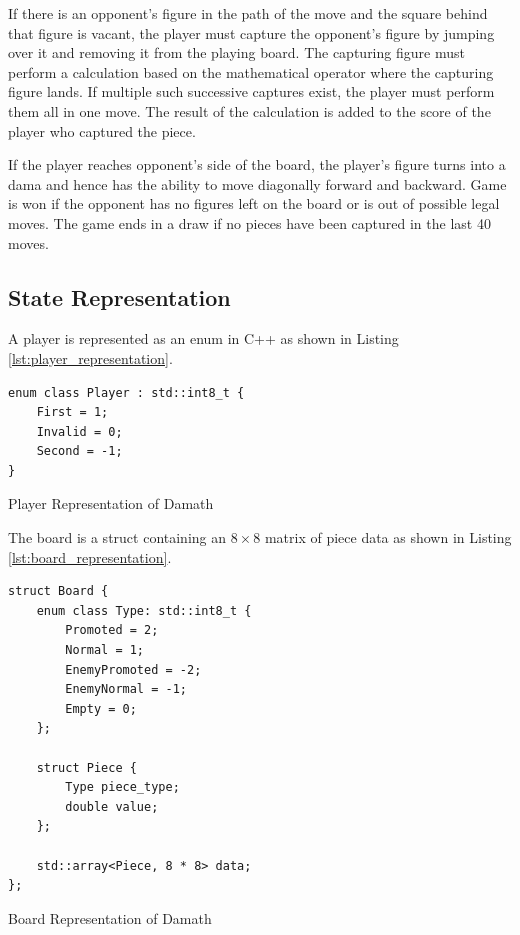 If there is an opponent's figure in the path of the move and the square behind that figure is vacant, the player must capture the opponent's figure by jumping over it and removing it from the playing board. The capturing figure must perform a calculation based on the mathematical operator where the capturing figure lands. If multiple such successive captures exist, the player must perform them all in one move. The result of the calculation is added to the score of the player who captured the piece.

If the player reaches opponent’s side of the board, the player's figure turns into a dama and hence has the ability to move diagonally forward and backward. Game is won if the opponent has no figures left on the board or is out of possible legal moves. The game ends in a draw if no pieces have been captured in the last 40 moves.

\clearpage

\subsection{State Representation}

A player is represented as an enum in C++ as shown in Listing \ref{lst:player_representation}.

\begin{listing}[htb]
\begin{verbatim}
enum class Player : std::int8_t {
    First = 1;
    Invalid = 0;
    Second = -1;
}
\end{verbatim}
\caption{Player Representation of Damath}
\label{lst:player_representation}
\end{listing}

The board is a struct containing an $8 \times 8$ matrix of piece data as shown in Listing \ref{lst:board_representation}.

\begin{listing}[htb]
\begin{verbatim}
struct Board {
    enum class Type: std::int8_t {
        Promoted = 2;
        Normal = 1;
        EnemyPromoted = -2;
        EnemyNormal = -1;
        Empty = 0;
    };
    
    struct Piece {
        Type piece_type;    
        double value;
    };

    std::array<Piece, 8 * 8> data;
};
\end{verbatim}
\caption{Board Representation of Damath}
\label{lst:board_representation}
\end{listing}

